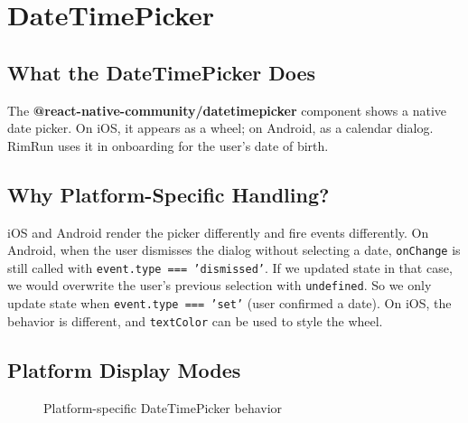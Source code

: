 \documentclass[11pt,a4paper]{article}
\begin{document}
\section{DateTimePicker}

\subsection{What the DateTimePicker Does}

The \textbf{@react-native-community/datetimepicker} component shows a native date picker. On iOS, it appears as a wheel; on Android, as a calendar dialog. RimRun uses it in onboarding for the user's date of birth.

\subsection{Why Platform-Specific Handling?}

iOS and Android render the picker differently and fire events differently. On Android, when the user dismisses the dialog without selecting a date, \texttt{onChange} is still called with \texttt{event.type === 'dismissed'}. If we updated state in that case, we would overwrite the user's previous selection with \texttt{undefined}. So we only update state when \texttt{event.type === 'set'} (user confirmed a date). On iOS, the behavior is different, and \texttt{textColor} can be used to style the wheel.

\subsection{Platform Display Modes}

\begin{figure}[h]
\centering
{}
\caption{Platform-specific DateTimePicker behavior}
\end{figure}
\end{document}
